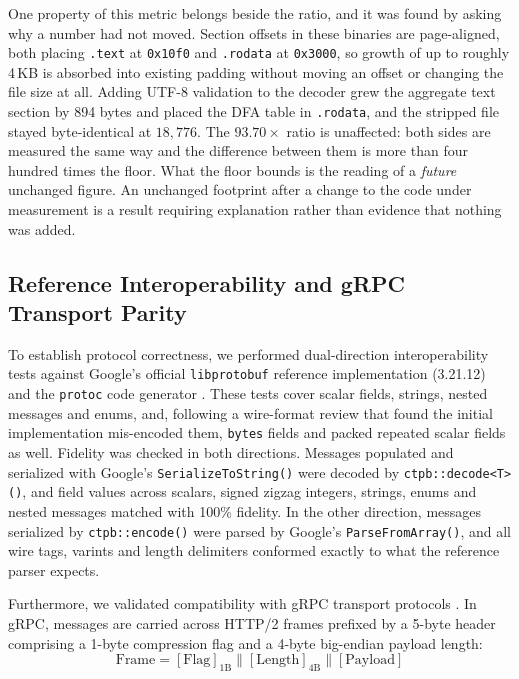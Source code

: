 One property of this metric belongs beside the ratio, and it was found by asking why a number had
not moved. Section offsets in these binaries are page-aligned, both placing \texttt{.text} at
\texttt{0x10f0} and \texttt{.rodata} at \texttt{0x3000}, so growth of up to roughly 4\,KB is
absorbed into existing padding without moving an offset or changing the file size at all. Adding
UTF-8 validation to the decoder grew the aggregate text section by 894 bytes and placed the DFA
table in \texttt{.rodata}, and the stripped file stayed byte-identical at $18{,}776$. The
$93.70\times$ ratio is unaffected: both sides are measured the same way and the difference between
them is more than four hundred times the floor. What the floor bounds is the reading of a
\emph{future} unchanged figure. An unchanged footprint after a change to the code under measurement
is a result requiring explanation rather than evidence that nothing was added.

\subsection{Reference Interoperability and gRPC Transport Parity}
To establish protocol correctness, we performed dual-direction interoperability tests against Google's official \texttt{libprotobuf} reference implementation (3.21.12) and the \texttt{protoc} code generator \cite{protobuf_spec}. These tests cover scalar fields, strings, nested messages and enums, and, following a wire-format review that found the initial implementation mis-encoded them, \texttt{bytes} fields and packed repeated scalar fields as well.
Fidelity was checked in both directions. Messages populated and serialized with Google's \texttt{SerializeToString()} were decoded by \texttt{ctpb::decode<T>()}, and field values across scalars, signed zigzag integers, strings, enums and nested messages matched with 100\% fidelity. In the other direction, messages serialized by \texttt{ctpb::encode()} were parsed by Google's \texttt{ParseFromArray()}, and all wire tags, varints and length delimiters conformed exactly to what the reference parser expects.

Furthermore, we validated compatibility with gRPC transport protocols \cite{grpc_spec}. In gRPC, messages are carried across HTTP/2 frames prefixed by a 5-byte header comprising a 1-byte compression flag and a 4-byte big-endian payload length:
\vspace{-0.3em}
\begin{equation}
\text{Frame} = [\text{Flag}]_{1\text{B}} \parallel [\text{Length}]_{4\text{B}} \parallel [\text{Payload}]
\end{equation}
\vspace{-0.3em}

